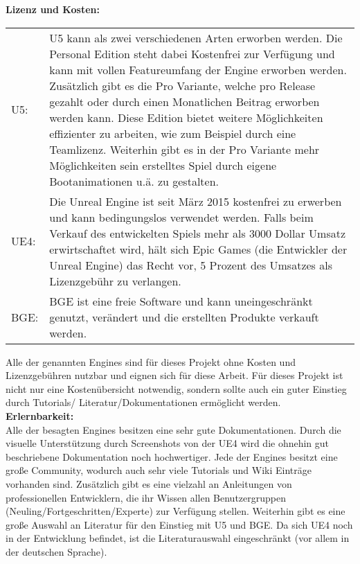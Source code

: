 \newpage

\textbf{Lizenz und Kosten:}
\begin{table}[H]
\centering
\renewcommand{\arraystretch}{1.5}
\begin{tabular}{lp{14.5cm}}
\ac{U5}: & \ac{U5} kann als zwei verschiedenen Arten erworben werden. Die Personal Edition steht dabei Kostenfrei zur Verfügung und kann mit vollen Featureumfang der Engine erworben werden. Zusätzlich gibt es die Pro Variante, welche pro Release gezahlt oder durch einen Monatlichen Beitrag erworben werden kann. Diese Edition bietet weitere Möglichkeiten effizienter zu arbeiten, wie zum Beispiel durch eine Teamlizenz. Weiterhin gibt es in der Pro Variante mehr Möglichkeiten sein erstelltes Spiel durch eigene Bootanimationen u.ä. zu gestalten.\\
UE4:& Die Unreal Engine ist seit März 2015 kostenfrei zu erwerben und kann bedingungslos verwendet werden. Falls beim Verkauf des entwickelten Spiels mehr als 3000 Dollar Umsatz erwirtschaftet wird, hält sich Epic Games (die Entwickler der Unreal Engine) das Recht vor, 5 Prozent des Umsatzes als Lizenzgebühr zu  verlangen.\\
\ac{BGE}: & \ac{BGE} ist eine freie Software  und kann uneingeschränkt genutzt, verändert und die erstellten Produkte verkauft werden.
\end{tabular}
\end{table}
Alle der genannten Engines sind für dieses Projekt ohne Kosten und Lizenzgebühren nutzbar und eignen sich für diese Arbeit.
Für dieses Projekt ist nicht nur eine Kostenübersicht notwendig, sondern sollte auch ein guter Einstieg durch Tutorials/ Literatur/Dokumentationen ermöglicht werden. \\

\textbf{Erlernbarkeit:}\\
Alle der besagten Engines besitzen eine sehr gute Dokumentationen. Durch die visuelle Unterstützung durch Screenshots von der \ac{UE4}  wird die ohnehin gut beschriebene Dokumentation noch hochwertiger. Jede der Engines besitzt eine große Community, wodurch auch sehr viele Tutorials und Wiki Einträge vorhanden sind. Zusätzlich gibt es eine  vielzahl an  Anleitungen von professionellen Entwicklern, die ihr Wissen allen Benutzergruppen (Neuling/Fortgeschritten/Experte) zur Verfügung stellen. Weiterhin gibt es eine große Auswahl an Literatur für den Einstieg mit \ac{U5} und \ac{BGE}. Da sich \ac{UE4} noch in der Entwicklung befindet, ist die Literaturauswahl eingeschränkt (vor allem in der deutschen Sprache).

